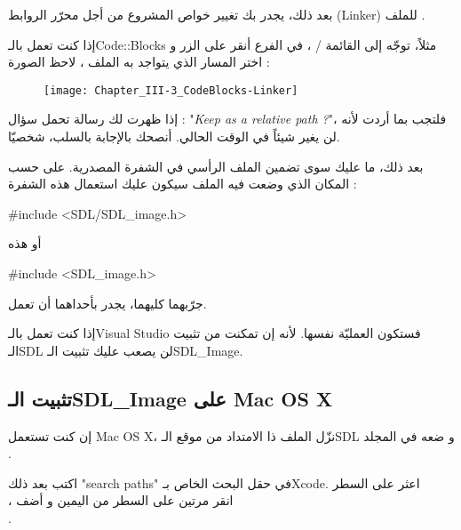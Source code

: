 بعد ذلك، يجدر بك تغيير خواص المشروع من أجل محرّر الروابط
(\textenglish{Linker})
للملف
.

إذا كنت تعمل بالـ\textenglish{Code::Blocks}
مثلاً، توجّه إلى القائمة
 / ،
في الفرع
أنقر على الزر 
و اختر المسار الذي يتواجد به الملف
،
لاحظ الصورة :

\begin{figure}[H]
	\centering
	\texttt{[image: Chapter\_III-3\_CodeBlocks-Linker]}
\end{figure}

إذا ظهرت لك رسالة تحمل سؤال : 
"\textit{\textenglish{Keep as a relative path ?}}"،
فلتجب بما أردت لأنه لن يغير شيئاً في الوقت الحالي. أنصحك بالإجابة بالسلب، شخصيّا.

بعد ذلك، ما عليك سوى تضمين الملف الرأسي
في الشفرة المصدرية. على حسب المكان الذي وضعت فيه الملف
سيكون عليك استعمال هذه الشفرة :

\begin{Csource}
#include <SDL/SDL_image.h>
\end{Csource}

أو هذه

\begin{Csource}
#include <SDL_image.h>
\end{Csource}

جرّبهما كليهما، يجدر بأحداهما أن تعمل.

\begin{information}
إذا كنت تعمل بالـ\textenglish{Visual Studio}
فستكون العمليّة نفسها. لأنه إن تمكنت من تثبيت الـ\textenglish{SDL}
لن يصعب عليك تثبيت الـ\textenglish{SDL\_Image}.
\end{information}

\subsection{تثبيت الـ\textenglish{SDL\_Image} على \textenglish{Mac OS X}}


إن كنت تستعمل
\textenglish{Mac OS X}،
نزّل الملف ذا الامتداد
من موقع الـ\textenglish{SDL}
و ضعه في المجلد\\
.

اكتب بعد ذلك
"\textenglish{search paths}"
 في حقل البحث الخاص بـ\textenglish{Xcode}.
 اعثر على السطر\\
،
 انقر مرتين على السطر من اليمين و أضف\\
.

